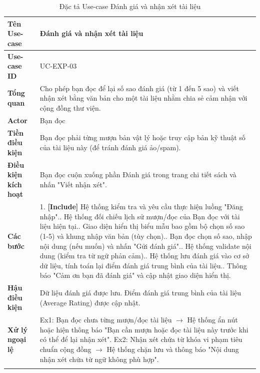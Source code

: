\begin{longtable}{|p{3.5cm}|p{11.5cm}|}
    \hline
    \textbf{Tên Use-case} & \textbf{Đánh giá và nhận xét tài liệu} \\
    \hline
    \textbf{Use-case ID} & UC-EXP-03 \\
    \hline
    \textbf{Tổng quan} & Cho phép bạn đọc để lại số sao đánh giá (từ 1 đến 5 sao) và viết nhận xét bằng văn bản cho một tài liệu nhằm chia sẻ cảm nhận với cộng đồng thư viện. \\
    \hline
    \textbf{Actor} & Bạn đọc \\
    \hline
    \textbf{Tiền điều kiện} & Bạn đọc phải từng mượn bản vật lý hoặc truy cập bản kỹ thuật số của tài liệu này (để tránh đánh giá ảo/spam). \\
    \hline
    \textbf{Điều kiện kích hoạt} & Bạn đọc cuộn xuống phần Đánh giá trong trang chi tiết sách và nhấn "Viết nhận xét". \\
    \hline
    \textbf{Các bước} & 
    1. \textbf{[Include]} Hệ thống kiểm tra và yêu cầu thực hiện luồng "Đăng nhập".\newline
    2. Hệ thống đối chiếu lịch sử mượn/đọc của Bạn đọc với tài liệu hiện tại.\newline
    3. Giao diện hiển thị biểu mẫu bao gồm bộ chọn số sao (1-5) và khung nhập văn bản (tùy chọn).\newline
    4. Bạn đọc chọn số sao, nhập nội dung (nếu muốn) và nhấn "Gửi đánh giá".\newline
    5. Hệ thống validate nội dung (kiểm tra từ ngữ phản cảm).\newline
    6. Hệ thống lưu đánh giá vào cơ sở dữ liệu, tính toán lại điểm đánh giá trung bình của tài liệu.\newline
    7. Thông báo "Cảm ơn bạn đã đánh giá" và cập nhật giao diện hiển thị. \\
    \hline
    \textbf{Hậu điều kiện} & Dữ liệu đánh giá được lưu. Điểm đánh giá trung bình của tài liệu (Average Rating) được cập nhật. \\
    \hline
    \textbf{Xử lý ngoại lệ} & 
    Ex1: Bạn đọc chưa từng mượn/đọc tài liệu $\rightarrow$ Hệ thống ẩn nút hoặc hiện thông báo "Bạn cần mượn hoặc đọc tài liệu này trước khi có thể để lại nhận xét".\newline
    Ex2: Nhận xét chứa từ khóa vi phạm tiêu chuẩn cộng đồng $\rightarrow$ Hệ thống chặn lưu và thông báo "Nội dung nhận xét chứa từ ngữ không phù hợp". \\
    \hline
    \caption{Đặc tả Use-case Đánh giá và nhận xét tài liệu}
\end{longtable}


